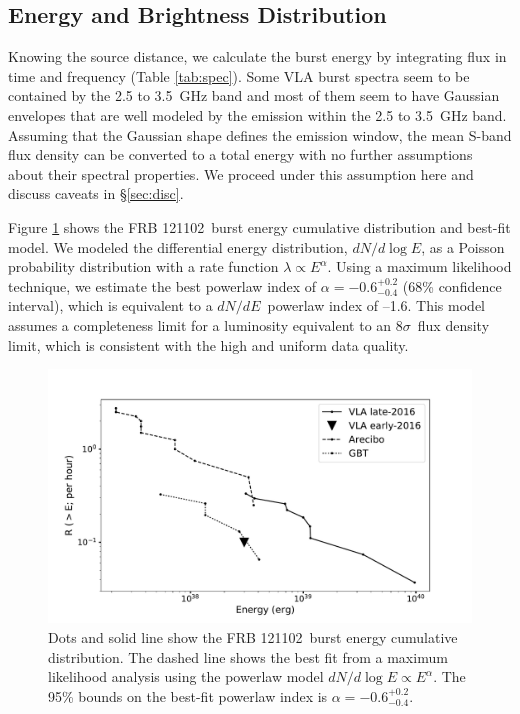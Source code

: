 \documentclass[twocolumn]{aastex61}
\newcommand{\frb}{FRB 121102}
\begin{document}
\subsection{Energy and Brightness Distribution}
\label{sec:disn}
Knowing the source distance, we calculate the burst energy by integrating flux in time and frequency (Table \ref{tab:spec}). Some VLA burst spectra seem to be contained by the 2.5 to 3.5~GHz band and most of them seem to have Gaussian envelopes that are well modeled by the emission within the 2.5 to 3.5~GHz band. Assuming that the Gaussian shape defines the emission window, the mean S-band flux density can be converted to a total energy with no further assumptions about their spectral properties. We proceed under this assumption here and discuss caveats in \S \ref{sec:disc}.

Figure \ref{fig:ed} shows the \frb\ burst energy cumulative distribution and best-fit model. We modeled the differential energy distribution, $dN/d\log{E}$, as a Poisson probability distribution with a rate function $\lambda\propto E^{\alpha}$. Using a maximum likelihood technique, we estimate the best powerlaw index of $\alpha=-0.6^{+0.2}_{-0.4}$ (68\% confidence interval), which is equivalent to a $dN/dE$\ powerlaw index of --1.6. This model assumes a completeness limit for a luminosity equivalent to an $8\sigma$\ flux density limit, which is consistent with the high and uniform data quality.

\begin{figure}[htb]
\begin{center}
\includegraphics[width=0.9\columnwidth]{energy_disn}
\caption{Dots and solid line show the  \frb\ burst energy cumulative distribution. The dashed line shows the best fit from a maximum likelihood analysis using the powerlaw model $dN/d\log{E} \propto E^{\alpha}$. The 95\% bounds on the best-fit powerlaw index is $\alpha=-0.6^{+0.2}_{-0.4}$. \label{fig:ed}}
\end{center}
\end{figure}
\end{document}
